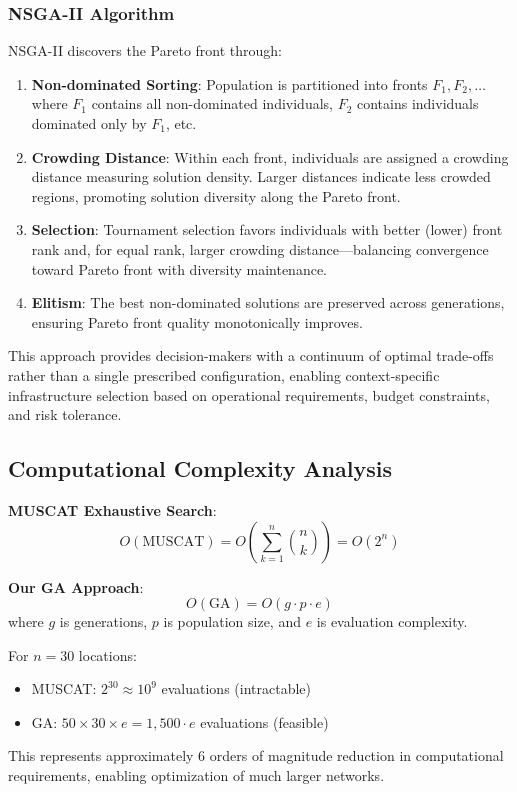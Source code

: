 \subsubsection{NSGA-II Algorithm}

NSGA-II discovers the Pareto front through:

\begin{enumerate}
\item \textbf{Non-dominated Sorting}: Population is partitioned into fronts $F_1, F_2, \ldots$ where $F_1$ contains all non-dominated individuals, $F_2$ contains individuals dominated only by $F_1$, etc.

\item \textbf{Crowding Distance}: Within each front, individuals are assigned a crowding distance measuring solution density. Larger distances indicate less crowded regions, promoting solution diversity along the Pareto front.

\item \textbf{Selection}: Tournament selection favors individuals with better (lower) front rank and, for equal rank, larger crowding distance—balancing convergence toward Pareto front with diversity maintenance.

\item \textbf{Elitism}: The best non-dominated solutions are preserved across generations, ensuring Pareto front quality monotonically improves.
\end{enumerate}

This approach provides decision-makers with a continuum of optimal trade-offs rather than a single prescribed configuration, enabling context-specific infrastructure selection based on operational requirements, budget constraints, and risk tolerance.

\subsection{Computational Complexity Analysis}

\textbf{MUSCAT Exhaustive Search}:
\begin{equation}
O(\text{MUSCAT}) = O\left(\sum_{k=1}^{n} \binom{n}{k}\right) = O(2^n)
\end{equation}

\textbf{Our GA Approach}:
\begin{equation}
O(\text{GA}) = O(g \cdot p \cdot e)
\end{equation}
where $g$ is generations, $p$ is population size, and $e$ is evaluation complexity.

For $n=30$ locations:
\begin{itemize}
\item MUSCAT: $2^{30} \approx 10^9$ evaluations (intractable)
\item GA: $50 \times 30 \times e = 1,500 \cdot e$ evaluations (feasible)
\end{itemize}

This represents approximately 6 orders of magnitude reduction in computational requirements, enabling optimization of much larger networks.


